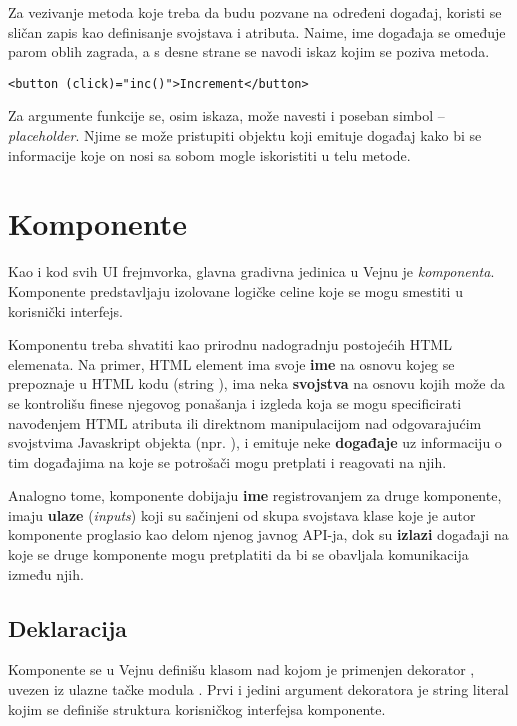 Za vezivanje metoda koje treba da budu pozvane na određeni događaj, koristi se sličan zapis kao definisanje svojstava i atributa.
Naime, ime događaja se omeđuje parom oblih zagrada, a s desne strane se navodi iskaz kojim se poziva metoda.

\begin{verbatim}
<button (click)="inc()">Increment</button>
\end{verbatim}

Za argumente funkcije se, osim iskaza, može navesti i poseban simbol \code{\#} -- \textsl{placeholder}.
Njime se može pristupiti objektu koji emituje događaj kako bi se informacije koje on nosi sa sobom mogle iskoristiti u telu metode.

\section{Komponente}

Kao i kod svih UI frejmvorka, glavna gradivna jedinica u Vejnu je \emph{komponenta}.
Komponente predstavljaju izolovane logičke celine koje se mogu smestiti u korisnički interfejs.

Komponentu treba shvatiti kao prirodnu nadogradnju postojećih HTML elemenata.
Na primer, HTML element  ima svoje \textbf{ime} na osnovu kojeg se prepoznaje u HTML kodu (string ), ima neka \textbf{svojstva} na osnovu kojih može da se kontrolišu finese njegovog ponašanja i izgleda koja se mogu specificirati navođenjem HTML atributa ili direktnom manipulacijom nad odgovarajućim svojstvima Javaskript objekta (npr. ), i emituje neke \textbf{događaje} uz informaciju o tim događajima na koje se potrošači mogu pretplati i reagovati na njih.

Analogno tome, komponente dobijaju \textbf{ime} registrovanjem za druge komponente, imaju \textbf{ulaze} (\textsl{inputs}) koji su sačinjeni od skupa svojstava klase koje je autor komponente proglasio kao delom njenog javnog API-ja, dok su \textbf{izlazi} događaji na koje se druge komponente mogu pretplatiti da bi se obavljala komunikacija između njih.

\subsection{Deklaracija}

Komponente se u Vejnu definišu klasom nad kojom je primenjen dekorator , uvezen iz ulazne tačke modula .
Prvi i jedini argument dekoratora je string literal kojim se definiše struktura korisničkog interfejsa komponente.

